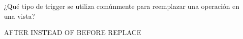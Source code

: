 \question[1] ¿Qué tipo de trigger se utiliza comúnmente para reemplazar una operación en una vista?
\begin{choices}
\choice AFTER
\CorrectChoice INSTEAD OF
\choice BEFORE
\choice REPLACE
\end{choices}